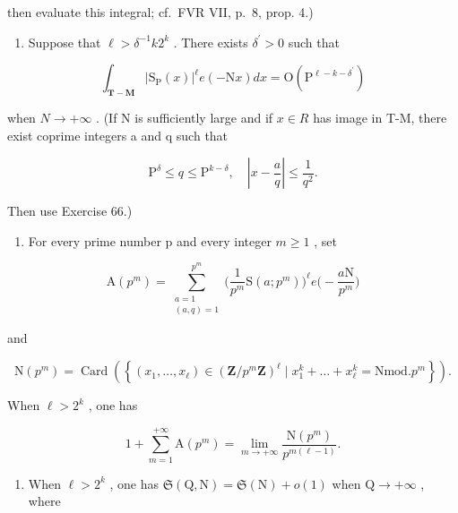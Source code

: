 then evaluate this integral; cf.~FVR VII, p.~8, prop. 4.)

\begin{enumerate}
\def\labelenumi{\alph{enumi})}
\setcounter{enumi}{4}
\tightlist
\item
  Suppose that \(\ell >\delta^{-1}k2^{k}\) . There exists \(\delta^{\prime} > 0\) such that
\end{enumerate}

\[
\int_ {\mathbf {T - M}} | \mathrm{S} _ {\mathrm{P}} (x) | ^ {\ell} e (- \mathrm{N} x) d x = \mathrm{O} (\mathrm{P} ^ {\ell - k - \delta^ {\prime}})
\]

when \(N \rightarrow +\infty\) . (If N is sufficiently large and if \(x \in R\) has image in T-M, there exist coprime integers a and q such that

\[
\mathrm{P} ^ {\delta} \leqslant q \leqslant \mathrm{P} ^ {k - \delta}, \quad \left| x - \frac {a}{q} \right| \leqslant \frac {1}{q ^ {2}}.
\]

Then use Exercise 66.)

\begin{enumerate}
\def\labelenumi{\alph{enumi})}
\setcounter{enumi}{5}
\tightlist
\item
  For every prime number p and every integer \(m \geqslant 1\) , set
\end{enumerate}

\[
\mathrm{A}(p^{m}) = \sum_{\substack{a = 1\\ (a,q) = 1}}^{p^{m}}\Big(\frac{1}{p^{m}}\mathrm{S}(a;p^{m})\Big)^{\ell}e\Big(-\frac{a\mathrm{N}}{p^{m}}\Big)
\]

and

\[
\mathrm{N} (p ^ {m}) = \operatorname{Card} \left(\left\{\left(x _ {1}, \dots , x _ {\ell}\right) \in (\mathbf {Z} / p ^ {m} \mathbf {Z}) ^ {\ell} \mid x _ {1} ^ {k} + \dots + x _ {\ell} ^ {k} = \mathrm{N mod.} p ^ {m} \right\}\right).
\]

When \(\ell > 2^k\) , one has

\[
1 + \sum_ {m = 1} ^ {+ \infty} \mathrm{A} (p ^ {m}) = \lim _ {m \to + \infty} \frac {\mathrm{N} (p ^ {m})}{p ^ {m (\ell - 1)}}.
\]

\begin{enumerate}
\def\labelenumi{\alph{enumi})}
\setcounter{enumi}{6}
\tightlist
\item
  When \(\ell > 2^k\) , one has \(\mathfrak{S}(\mathrm{Q}, \mathrm{N}) = \mathfrak{S}(\mathrm{N}) + o(1)\) when \(\mathrm{Q} \to +\infty\) , where
\end{enumerate}

